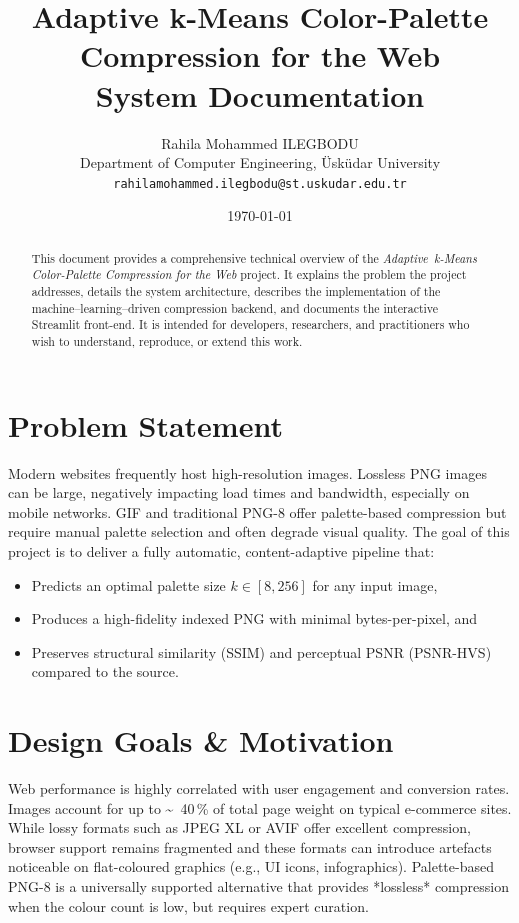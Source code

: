 \documentclass[11pt]{article}
\title{Adaptive k-Means Color-Palette Compression for the Web\\\Large System Documentation}
\author{Rahila Mohammed ILEGBODU \\ Department of Computer Engineering, \"Usk\"udar University \\ \texttt{rahilamohammed.ilegbodu@st.uskudar.edu.tr}}
\date{\today}
\begin{document}
\maketitle

\begin{abstract}
This document provides a comprehensive technical overview of the \emph{Adaptive~k-Means Color-Palette Compression for the Web} project. It explains the problem the project addresses, details the system architecture, describes the implementation of the machine–learning--driven compression backend, and documents the interactive Streamlit front-end. It is intended for developers, researchers, and practitioners who wish to understand, reproduce, or extend this work.
\end{abstract}

\tableofcontents
\newpage

\section{Problem Statement}
Modern websites frequently host high-resolution images. Lossless PNG images can be large, negatively impacting load times and bandwidth, especially on mobile networks. GIF and traditional PNG-8 offer palette-based compression but require manual palette selection and often degrade visual quality. The goal of this project is to deliver a fully automatic, content-adaptive pipeline that:
\begin{itemize}
  \item Predicts an optimal palette size $k\in[8,256]$ for any input image,
  \item Produces a high-fidelity indexed PNG with minimal bytes-per-pixel, and
  \item Preserves structural similarity (SSIM) and perceptual PSNR (PSNR-HVS) compared to the source.
\end{itemize}

\section{Design Goals \& Motivation}
Web performance is highly correlated with user engagement and conversion rates. Images account for up to \textasciitilde~40\,\% of total page weight on typical e-commerce sites. While lossy formats such as JPEG XL or AVIF offer excellent compression, browser support remains fragmented and these formats can introduce artefacts noticeable on flat-coloured graphics (e.g., UI icons, infographics). Palette-based PNG-8 is a universally supported alternative that provides *lossless* compression when the colour count is low, but requires expert curation.
\end{document}
